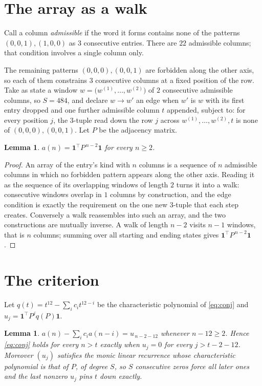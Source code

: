 \documentclass[11pt,a4paper]{article}
\theoremstyle{plain}
\newtheorem{lemma}[theorem]{Lemma}
\theoremstyle{definition}
\begin{document}
\section{The array as a walk}

Call a column \emph{admissible} if the word it forms contains none of the patterns
$(0,0,1), (1,0,0)$ as $3$ consecutive entries. There are $22$ admissible columns; that condition
involves a single column only.

The remaining patterns $(0,0,0), (0,0,1)$ are forbidden along the other axis, so each of them
constrains $3$ consecutive columns at a fixed position of the row. Take as state a
window $w=\bigl(w^{(1)},\dots,w^{(2)}\bigr)$ of $2$ consecutive admissible
columns, so $S=484$, and declare $w\to w'$ an edge when $w'$ is $w$ with its first entry
dropped and one further admissible column $t$ appended, subject to: for every position
$j$, the $3$-tuple read down the row $j$ across $w^{(1)},\dots,w^{(2)},t$
is none of $(0,0,0), (0,0,1)$. Let $P$ be the adjacency matrix.

\begin{lemma}\label{lem:walk}
$a(n)=\mathbf{1}^{\!\top}P^{\,n-2}\mathbf{1}$ for every $n\ge2$.
\end{lemma}

\begin{proof}
An array of the entry's kind with $n$ columns is a sequence of $n$ admissible columns in
which no forbidden pattern appears along the other axis. Reading it as the sequence of its
overlapping windows of length $2$ turns it into a walk: consecutive windows overlap in
$1$ columns by construction, and the edge condition is exactly the requirement on the one
new $3$-tuple that each step creates. Conversely a walk reassembles into such an array,
and the two constructions are mutually inverse. A walk of length $n-2$ visits $n-1$
windows, that is $n$ columns; summing over all starting and ending states gives
$\mathbf{1}^{\!\top}P^{\,n-2}\mathbf{1}$.
\end{proof}

\section{The criterion}

Let $q(t)=t^{12}-\sum_i c_i t^{12-i}$ be the characteristic polynomial of
\eqref{eq:conj} and $u_j=\mathbf{1}^{\!\top}P^{j}q(P)\mathbf{1}$.

\begin{lemma}\label{lem:crit}
$a(n)-\sum_i c_i a(n-i)=u_{\,n-2-12}$ whenever $n-12\ge2$. Hence
\eqref{eq:conj} holds for every $n>t$ exactly when $u_j=0$ for every
$j>t-2-12$. Moreover $(u_j)$ satisfies the monic linear recurrence whose
characteristic polynomial is that of $P$, of degree $S$, so $S$ consecutive zeros force all
later ones and the last nonzero $u_j$ pins $t$ down exactly.
\end{lemma}
\end{document}

